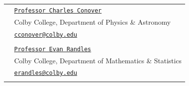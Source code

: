 \documentclass[10pt]{article}
\begin{document}
\begin{longtable}{ l p{14.7cm}   }
  						
  						& \href{https://www.colby.edu/directory/profile/charles.conover/}{\texttt{Professor Charles Conover}} \\
  						& Colby College, Department of Physics \& Astronomy \\
  						& {\href{mailto:cconover@colby.edu}{\texttt{cconover@colby.edu}}}\\
  						& \\
  						
  						
  						
  						& \href{https://personal.colby.edu/~erandles/}{\texttt{Professor Evan Randles}} \\
  						& Colby College, Department of Mathematics \& Statistics \\
  						& {\href{mailto:erandles@colby.edu}{\texttt{erandles@colby.edu}}} \\
  						& \\
  						
  						
  
  
\end{longtable}
\end{document}
